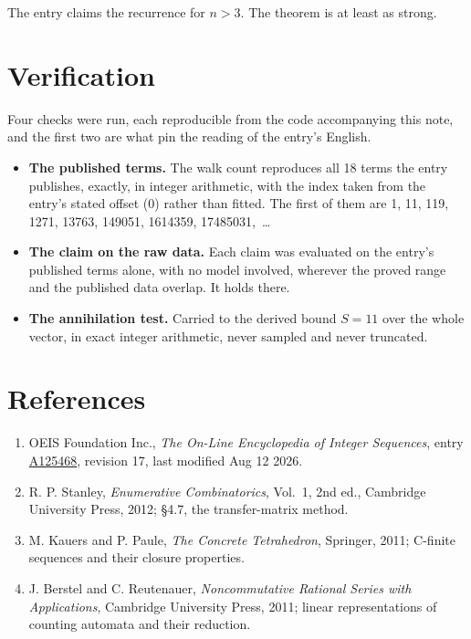 \documentclass[11pt]{article}
\theoremstyle{definition}
\begin{document}
The entry claims the recurrence for $n > 3$. The theorem is at least as strong.

\section{Verification}

Four checks were run, each reproducible from the code accompanying this note, and the first two are what pin the reading of the entry's English.

\begin{itemize}

\item {\bfseries The published terms.} The walk count reproduces all 18 terms the entry publishes, exactly, in integer arithmetic, with the index taken from the entry's stated offset (0) rather than fitted. The first of them are 1, 11, 119, 1271, 13763, 149051, 1614359, 17485031,~\dots

\item {\bfseries The claim on the raw data.} Each claim was evaluated on the entry's published terms alone, with no model involved, wherever the proved range and the published data overlap. It holds there.

\item {\bfseries The annihilation test.} Carried to the derived bound $S = 11$ over the whole vector, in exact integer arithmetic, never sampled and never truncated.

\end{itemize}

\section{References}

\begin{enumerate}

\item OEIS Foundation Inc., \emph{The On-Line Encyclopedia of Integer Sequences}, entry \href{https://oeis.org/A125468}{A125468}, revision 17, last modified Aug 12 2026.

\item R. P. Stanley, \emph{Enumerative Combinatorics}, Vol.~1, 2nd ed., Cambridge University Press, 2012; \S4.7, the transfer-matrix method.

\item M. Kauers and P. Paule, \emph{The Concrete Tetrahedron}, Springer, 2011; C-finite sequences and their closure properties.

\item J. Berstel and C. Reutenauer, \emph{Noncommutative Rational Series with Applications}, Cambridge University Press, 2011; linear representations of counting automata and their reduction.

\end{enumerate}
\end{document}
